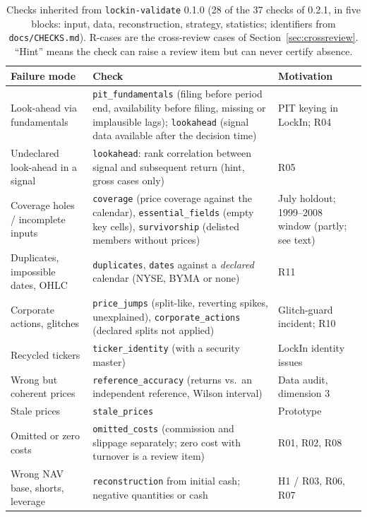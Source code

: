 \documentclass[11pt]{article}
\begin{document}
\begin{table}[t]
\centering
\caption{Checks inherited from \texttt{lockin-validate} 0.1.0 (28 of the 37 checks of 0.2.1, in five blocks: input, data, reconstruction, strategy, statistics; identifiers from \texttt{docs/CHECKS.md}). R-cases are the cross-review cases of Section~\ref{sec:crossreview}. ``Hint'' means the check can raise a review item but can never certify absence.}
\label{tab:checks}
\small
\begin{tabularx}{\textwidth}{>{\raggedright\arraybackslash}p{3.3cm}>{\raggedright\arraybackslash}X>{\raggedright\arraybackslash}p{3.7cm}}
\toprule
Failure mode & Check & Motivation \\
\midrule
Look-ahead via fundamentals & \texttt{pit\_fundamentals} (filing before period end, availability before filing, missing or implausible lags); \texttt{lookahead} (signal data available after the decision time) & PIT keying in LockIn; R04 \\
Undeclared look-ahead in a signal & \texttt{lookahead}: rank correlation between signal and subsequent return (hint, gross cases only) & R05 \\
Coverage holes / incomplete inputs & \texttt{coverage} (price coverage against the calendar), \texttt{essential\_fields} (empty key cells), \texttt{survivorship} (delisted members without prices) & July holdout; 1999--2008 window (partly; see text) \\
Duplicates, impossible dates, OHLC & \texttt{duplicates}, \texttt{dates} against a \emph{declared} calendar (NYSE, BYMA or none) & R11 \\
Corporate actions, glitches & \texttt{price\_jumps} (split-like, reverting spikes, unexplained), \texttt{corporate\_actions} (declared splits not applied) & Glitch-guard incident; R10 \\
Recycled tickers & \texttt{ticker\_identity} (with a security master) & LockIn identity issues \\
Wrong but coherent prices & \texttt{reference\_accuracy} (returns vs.\ an independent reference, Wilson interval) & Data audit, dimension 3 \\
Stale prices & \texttt{stale\_prices} & Prototype \\
Omitted or zero costs & \texttt{omitted\_costs} (commission and slippage separately; zero cost with turnover is a review item) & R01, R02, R08 \\
Wrong NAV base, shorts, leverage & \texttt{reconstruction} from initial cash; negative quantities or cash & H1 / R03, R06, R07 \\

\end{tabularx}
\end{table}
\end{document}
